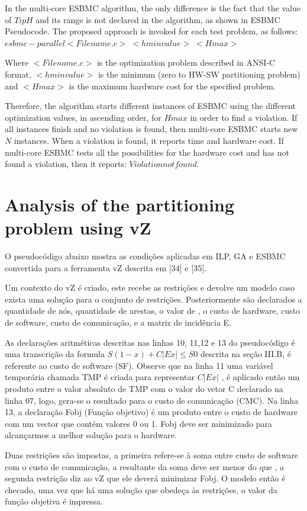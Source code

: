 In the multi-core ESBMC algorithm, the only difference is the fact that the value of $ TipH $ and its range is not declared in the algorithm, as shown in ESBMC Pseudocode. The proposed approach is invoked for each test problem, as follows:
$ esbmc-parallel <Filename.c> \; <hminvalue> \; <Hmax> $

Where $ <Filename.c> $ is the optimization problem described in ANSI-C format, $  <hminvalue> $ is the minimum (zero to HW-SW partitioning problem) and $ <Hmax> $ is the maximum hardware cost for the specified problem.

Therefore, the algorithm starts  different instances of ESBMC using the different optimization values, in ascending order, for $ Hmax $ in order to find a violation. If all instances finish and no violation is found, then multi-core ESBMC starts new $ N $ instances. When a violation is found, it reports time and hardware cost. If multi-core ESBMC tests all the possibilities for the hardware cost and has not found a violation, then it reports: $ Violation not found $.

\section{Analysis of the partitioning problem using vZ}
O pseudocódigo abaixo mostra as condições aplicadas em ILP, GA e ESBMC convertida para a ferramenta vZ descrita em [34] e [35]. 

Um contexto do vZ é criado, este recebe as restrições e devolve um modelo caso exista uma solução para o conjunto de restrições.  Posteriormente são declarados a quantidade de nós, quantidade de arestas, o valor de , o custo de hardware, custo de software, custo de comunicação, e a matriz de incidência E.   

As declarações aritméticas descritas nas linhas 10, 11,12 e 13 do pseudocódigo é uma transcrição da formula $ S(1-x) + C|Ex| \leq S{0} $ descrita na seção III.B, é referente ao custo de software (SF). Observe que na linha 11 uma variável temporária chamada TMP é criada para representar $C|Ex|$  , é aplicado então um produto entre o valor absoluto de TMP com o valor do vetor C declarado na linha 07, logo, gera-se o resultado para o custo de comunicação (CMC). 
Na linha 13, a declaração Fobj (Função objetivo) é um produto entre o custo de hardware com um vector que contém valores 0 ou 1. Fobj deve ser minimizado para alcançarmos a melhor solução para o hardware.

Duas restrições são impostas, a primeira refere-se à soma entre custo de software com o custo de comunicação, a resultante da soma deve ser menor do que , a segunda restrição diz ao vZ que ele deverá minimizar Fobj. O modelo então é checado, uma vez que há uma solução que obedeça às restrições, o valor da função objetiva é impressa. 

